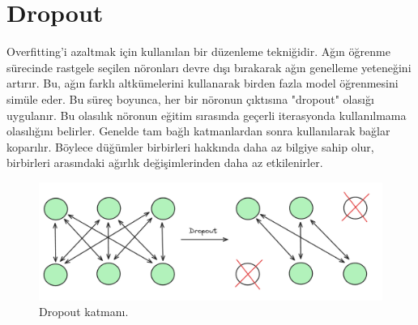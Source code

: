 \section{Dropout}
Overfitting'i azaltmak için kullanılan bir düzenleme tekniğidir. Ağın öğrenme sürecinde rastgele seçilen nöronları devre dışı bırakarak ağın genelleme yeteneğini artırır. Bu, ağın farklı altkümelerini kullanarak birden fazla model öğrenmesini simüle eder. Bu süreç boyunca, her bir nöronun çıktısına "dropout" olasığı uygulanır. Bu olasılık nöronun eğitim sırasında geçerli iterasyonda kullanılmama olasılığını belirler. Genelde tam bağlı katmanlardan sonra kullanılarak bağlar koparılır. Böylece düğümler birbirleri hakkında daha az bilgiye sahip olur, birbirleri arasındaki ağırlık değişimlerinden daha az etkilenirler.

\begin{figure}[h]
    \centering
    \includegraphics[width=1\textwidth]{images/dropout_layer.png}
    \caption{Dropout katmanı.}
    \label{fig:enter-label}
\end{figure}

\newpage